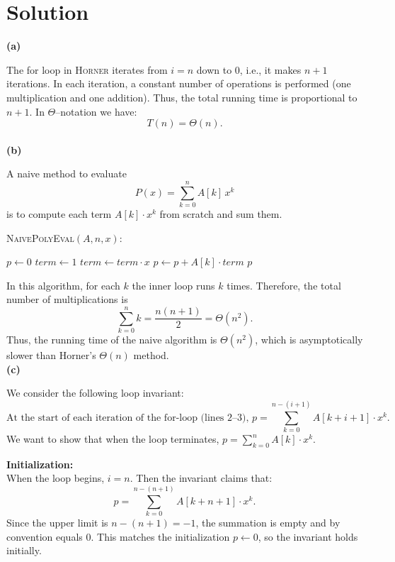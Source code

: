 \documentclass[11pt]{article}
\begin{document}
    \section*{Solution}

    \textbf{(a)}
    
    The for loop in \textsc{Horner} iterates from $i=n$ down to $0$, i.e., it makes $n+1$ iterations. In each iteration, a constant number of operations is performed (one multiplication and one addition). Thus, the total running time is proportional to $n+1$. In $\Theta$--notation we have:
    \[
    T(n)=\Theta(n).
    \]
    \\
    \textbf{(b)}
    
    A naive method to evaluate
    \[
    P(x) = \sum_{k=0}^n A[k] \, x^k
    \]
    is to compute each term \(A[k] \cdot x^k\) from scratch and sum them. 
    
    \bigskip
    \textsc{NaivePolyEval}$(A, n, x)$:
    \begin{algorithmic}[1]
        \STATE $p \gets 0$
            \STATE $term \gets 1$
                \STATE $term \gets term \cdot x$
            \ENDFOR
            \STATE $p \gets p + A[k] \cdot term$
        \ENDFOR
        \RETURN $p$
    \end{algorithmic}
    \bigskip
    
    In this algorithm, for each $k$ the inner loop runs $k$ times. Therefore, the total number of multiplications is
    \[
    \sum_{k=0}^{n} k = \frac{n(n+1)}{2} = \Theta(n^2).
    \]
    Thus, the running time of the naive algorithm is $\Theta(n^2)$, which is asymptotically slower than Horner's $\Theta(n)$ method.
    \\
    \textbf{(c)}
    
    We consider the following loop invariant:
    \[
    \text{At the start of each iteration of the for-loop (lines 2--3), } p = \sum_{k=0}^{n-(i+1)} A[k+i+1] \cdot x^k.
    \]
    We want to show that when the loop terminates, $p = \sum_{k=0}^n A[k]\cdot x^k$.
    
    \textbf{Initialization:} \\
    When the loop begins, $i = n$. Then the invariant claims that:
    \[
    p = \sum_{k=0}^{n-(n+1)} A[k+n+1] \cdot x^k.
    \]
    Since the upper limit is $n-(n+1) = -1$, the summation is empty and by convention equals $0$. This matches the initialization $p \gets 0$, so the invariant holds initially.
    
\end{document}
